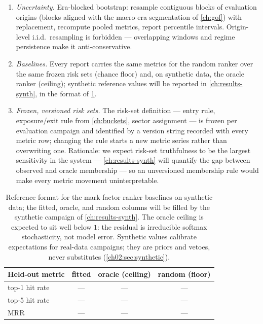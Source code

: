 \begin{protocol}
\begin{enumerate}[label=(\alph*)]
NLL of \cref{eq:ch10:nll} on the same events: the list metrics say
whether the sort is right, the NLL says whether the probabilities feeding
the decision layer are right, and \cref{lem:ch10:topk} is the license to
demand both from one model.
\item \emph{Uncertainty.} Era-blocked bootstrap: resample contiguous
blocks of evaluation origins (blocks aligned with the macro-era
segmentation of \cref{ch:gof}) with replacement, recompute pooled
metrics, report percentile intervals. Origin-level i.i.d.\ resampling is
forbidden --- overlapping windows and regime persistence make it
anti-conservative.
\item \emph{Baselines.} Every report carries the same metrics for the
random ranker over the same frozen risk sets (chance floor) and, on
synthetic data, the oracle ranker (ceiling); synthetic reference values
will be reported in \cref{ch:results-synth}, in the format of
\cref{tab:ch10:rehearsal}.
\item \emph{Frozen, versioned risk sets.} The risk-set definition ---
entry rule, exposure/exit rule from \cref{ch:buckets}, sector assignment
--- is frozen per evaluation campaign and identified by a version string
recorded with every metric row; changing the rule starts a new metric
series rather than overwriting one. Rationale: we expect risk-set
truthfulness to be the largest sensitivity in the system ---
\cref{ch:results-synth} will quantify the gap between observed and
oracle membership --- so an unversioned membership rule would make
every metric movement uninterpretable.
\end{enumerate}
\end{protocol}

\begin{table}[htbp]
\centering
\small
\begin{tabular}{lccc}
\toprule
\textbf{Held-out metric} & \textbf{fitted} & \textbf{oracle (ceiling)} &
\textbf{random (floor)} \\
\midrule
top-1 hit rate & --- & --- & --- \\
top-5 hit rate & --- & --- & --- \\
MRR            & --- & --- & --- \\
\bottomrule
\end{tabular}
\caption{Reference format for the mark-factor ranker baselines on
synthetic data; the fitted, oracle, and random columns will be filled
by the synthetic campaign of \cref{ch:results-synth}. The oracle
ceiling is expected to sit well below $1$: the residual is irreducible
softmax stochasticity, not model error. Synthetic values calibrate
expectations for real-data campaigns; they are priors and vetoes,
never substitutes (\cref{ch02:sec:synthetic}).}
\label{tab:ch10:rehearsal}
\end{table}

